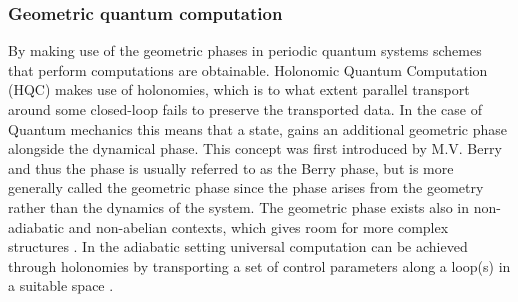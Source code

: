 \subsubsection{Geometric quantum computation}
By making use of the geometric phases in periodic quantum systems schemes that perform computations are obtainable. Holonomic Quantum Computation (HQC) makes use of holonomies, which is to what extent parallel transport around some closed-loop fails to preserve the transported data. In the case of Quantum mechanics this means that a state, gains an additional geometric phase alongside the dynamical phase. This concept was first introduced by M.V. Berry \cite{berry} and thus the phase is usually referred to as the Berry phase, but is more generally called the geometric phase since the phase arises from the geometry rather than the dynamics of the system. The geometric phase exists also in non-adiabatic and non-abelian contexts, which gives room for more complex structures \cite{anandan1, anandan2, zee}. 
In the adiabatic setting universal computation can be achieved through holonomies by transporting a set of control parameters along a loop(s) in a suitable space \cite{HQC}. 

